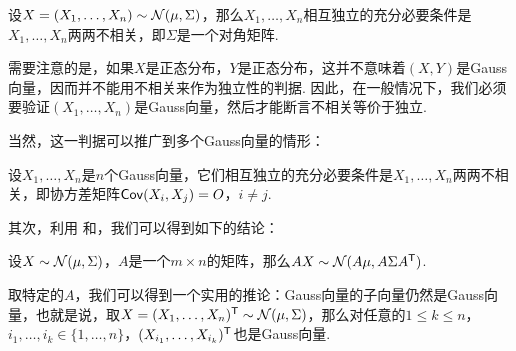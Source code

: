 \begin{proposition}\label{prop:gauss-vector-independence}
设$X=(X_1,\dots,X_n)\sim\mathcal{N}(\mu,\Sigma)$，那么$X_1,\dots,X_n$相互独立的充分必要条件是$X_1,\dots,X_n$两两不相关，即$\Sigma$是一个对角矩阵. 
\end{proposition}

需要注意的是，如果$X$是正态分布，$Y$是正态分布，这并不意味着$(X,Y)$是Gauss向量，因而并不能用不相关来作为独立性的判据. 因此，在一般情况下，我们必须要验证$(X_1,\dots,X_n)$是Gauss向量，然后才能断言不相关等价于独立. 

当然，这一判据可以推广到多个Gauss向量的情形：

\begin{proposition}\label{prop:gauss-vector-independence-2}
设$X_1,\dots,X_n$是$n$个Gauss向量，它们相互独立的充分必要条件是$X_1,\dots,X_n$两两不相关，即协方差矩阵$\mathsf{Cov}(X_i,X_j)=O$，$i\neq j$.
\end{proposition}


其次，利用 和，我们可以得到如下的结论：

\begin{proposition}\label{prop:gauss-vector-linear}
设$X\sim\mathcal{N}(\mu,\Sigma)$，$A$是一个$m\times n$的矩阵，那么$AX\sim\mathcal{N}(A\mu,A\Sigma A^{\mathsf{T}})$.
\end{proposition}

取特定的$A$，我们可以得到一个实用的推论：Gauss向量的子向量仍然是Gauss向量，也就是说，取$X=(X_1,\dots,X_n)^{\mathsf{T}}\sim\mathcal{N}(\mu,\Sigma)$，那么对任意的$1\leq k\leq n$，$i_1,\dots,i_k\in\{1,\dots,n\}$，$(X_{i_1},\dots,X_{i_k})^{\mathsf{T}}$也是Gauss向量. 


\endgroup